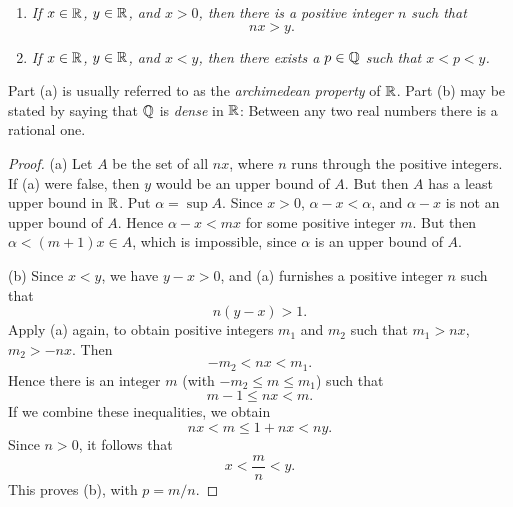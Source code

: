 \documentclass[11pt,twoside]{article}
\begin{document}
\begin{enumerate}[label=(\alph*), leftmargin=2.2em, itemsep=3pt, topsep=3pt]
  \item \emph{If $x \in \mathbb{R}$, $y \in \mathbb{R}$, and $x > 0$, then there is a positive
        integer $n$ such that}
        \[ nx > y. \]
  \item \emph{If $x \in \mathbb{R}$, $y \in \mathbb{R}$, and $x < y$, then there exists a
        $p \in \mathbb{Q}$ such that $x < p < y$.}
\end{enumerate}
Part (a) is usually referred to as the \emph{archimedean property} of $\mathbb{R}$. Part
(b) may be stated by saying that $\mathbb{Q}$ is \emph{dense} in $\mathbb{R}$: Between any two
real numbers there is a rational one.

\begin{proof}
(a) Let $A$ be the set of all $nx$, where $n$ runs through the positive
integers. If (a) were false, then $y$ would be an upper bound of $A$. But then
$A$ has a least upper bound in $\mathbb{R}$. Put $\alpha = \sup A$. Since $x > 0$,
$\alpha - x < \alpha$, and $\alpha - x$ is not an upper bound of $A$. Hence
$\alpha - x < mx$ for some positive integer $m$. But then
$\alpha < (m+1)x \in A$, which is impossible, since $\alpha$ is an upper bound
of $A$.

(b) Since $x < y$, we have $y - x > 0$, and (a) furnishes a positive integer $n$
such that
\[ n(y-x) > 1. \]
Apply (a) again, to obtain positive integers $m_1$ and $m_2$ such that
$m_1 > nx$, $m_2 > -nx$. Then
\[ -m_2 < nx < m_1. \]
Hence there is an integer $m$ (with $-m_2 \le m \le m_1$) such that
\[ m - 1 \le nx < m. \]
If we combine these inequalities, we obtain
\[ nx < m \le 1 + nx < ny. \]
Since $n > 0$, it follows that
\[ x < \frac{m}{n} < y. \]
This proves (b), with $p = m/n$.
\end{proof}
\end{document}

